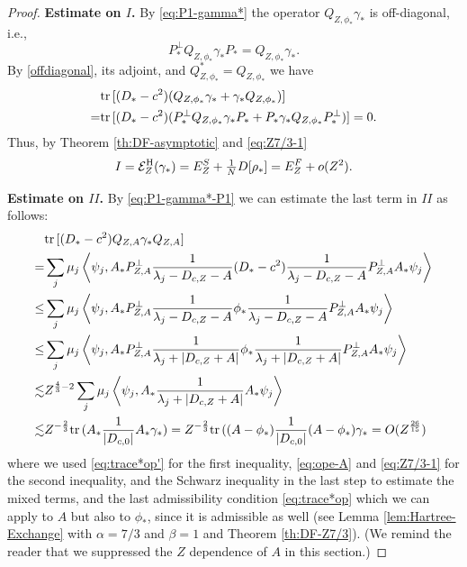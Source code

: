 \documentclass[a4paper]{amsart}
\def\tr{{\rm tr \,}}
\def\cE{{\mathcal E}}
\begin{document}
\begin{proof}
\medskip

{\bf Estimate on $I$.} By \eqref{eq:P1-gamma*} the operator $Q_{Z,\phi_*}\gamma_*$ is off-diagonal, i.e.,
\begin{equation}
  \label{offdiagonal}
  P_*^\perp  Q_{Z,\phi_*}\gamma_* P_*=  Q_{Z,\phi_*}\gamma_*.
\end{equation}
By \eqref{offdiagonal}, its adjoint, and $Q_{Z,\phi_*}^*=Q_{Z,\phi_*}$ we have
\begin{equation}
  \label{eq:96}
  \begin{split}
  &\tr[(D_*-c^2) (Q_{Z,\phi_*}\gamma_*+\gamma_* Q_{Z,\phi_*})]\\
    = &\tr[(D_*-c^2) ( P_*^\perp  Q_{Z,\phi_*}\gamma_* P_* + P_*  \gamma_* Q_{Z,\phi_*} P_*^\perp)] =0.
  \end{split}
\end{equation}
Thus, by Theorem \ref{th:DF-asymptotic} and \eqref{eq:Z7/3-1} 
\begin{equation}\label{eq:I}
    I=\cE_{Z}^{\rm H}(\gamma_*)=E_Z^S+\tfrac1ND[\rho_*] =E_Z^F+o(Z^2).
\end{equation}

\medskip

{\bf Estimate on $II$.} By \eqref{eq:P1-gamma*-P1} we can estimate the
last term in $II$ as follows:
\begin{equation}\label{eq:P-gamma-P-A}
  \begin{split}
    &\tr[(D_*-c^2)Q_{Z,A}\gamma_* Q_{Z,A}]\\
    = &\sum_{j}\mu_j\left<\psi_j,A_*P_{Z,A}^{\perp}\frac{1}{\lambda_j-D_{c,Z}-A} (D_*-c^2)\frac{1}{\lambda_j-D_{c,Z}-A} P_{Z,A}^{\perp}  A_*\psi_j\right>\\
    \leq & \sum_{j}\mu_j\left<\psi_j,A_*P_{Z,A}^{\perp}\frac{1}{\lambda_j-D_{c,Z}-A} \phi_*\frac{1}{\lambda_j-D_{c,Z}-A} P_{Z,A}^{\perp}  A_*\psi_j\right>\\
     \leq & \sum_{j}\mu_j\left<\psi_j,A_*P_{Z,A}^{\perp}\frac{1}{\lambda_j+|D_{c,Z}+A|} \phi_*\frac{1}{\lambda_j+|D_{c,Z}+A|} P_{Z,A}^{\perp}  A_*\psi_j\right>\\
    \lesssim &Z^{\frac43-2} \sum_{j}\mu_j\left<\psi_j,A_*\frac{1}{\lambda_j+|D_{c,Z}+A|}   A_*\psi_j\right>\\
    \lesssim &Z^{-\frac23} \tr(A_*\frac{1}{|D_{c,0}|} A_*\gamma_*)
    = Z^{-\frac23} \tr((A-\phi_*)\frac{1}{|D_{c,0}|} (A-\phi_*)\gamma_* =O(Z^\frac{26}{15})
  \end{split}
\end{equation}
where we used \eqref{eq:trace*op'} for the first inequality,
\eqref{eq:ope-A} and \eqref{eq:Z7/3-1} for the second inequality, and
the Schwarz inequality in the last step to estimate the mixed terms,
and the last admissibility condition \eqref{eq:trace*op} which we can
apply to $A$ but also to $\phi_*$, since it is admissible as well (see
Lemma \ref{lem:Hartree-Exchange} with $\alpha=7/3$ and $\beta=1$ and
Theorem \ref{th:DF-Z7/3}). (We remind the reader that we suppressed
the $Z$ dependence of $A$ in this section.)


\end{proof}
\end{document}
